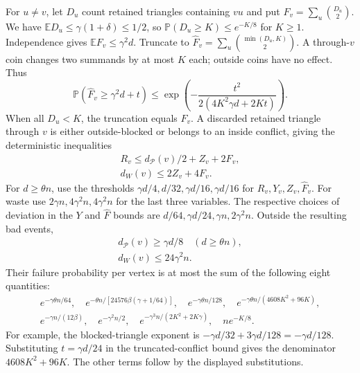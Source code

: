 \documentclass[english,11pt,a4paper]{article}
\begin{document}
For \(u\ne v\), let \(D_u\) count retained triangles containing \(vu\) and put \(F_v=\sum_u\binom{D_u}{2}\). We have \(\mathbb ED_u\le\gamma(1+\delta)\le1/2\), so \(\mathbb P(D_u\ge K)\le e^{-K/8}\) for \(K\ge1\). Independence gives \(\mathbb EF_v\le\gamma^2d\). Truncate to \(\widehat F_v=\sum_u\binom{\min(D_u,K)}2\). A through-\(v\) coin changes two summands by at most \(K\) each; outside coins have no effect. Thus \[\mathbb P(\widehat F_v\ge\gamma^2d+t)
\le\exp\left(-\frac{t^2}{2(4K^2\gamma d+2Kt)}\right).\] When all \(D_u<K\), the truncation equals \(F_v\). A discarded retained triangle through \(v\) is either outside-blocked or belongs to an inside conflict, giving the deterministic inequalities \[\begin{gathered}
R_v\le d_{\mathcal P}(v)/2+Z_v+2F_v,\\
d_W(v)\le2Z_v+4F_v.
\end{gathered}\] For \(d\ge\theta n\), use the thresholds \(\gamma d/4,d/32,\gamma d/16,\gamma d/16\) for \(R_v,Y_v,Z_v,\widehat F_v\). For waste use \(2\gamma n,4\gamma^2n,4\gamma^2n\) for the last three variables. The respective choices of deviation in the \(Y\) and \(\widehat F\) bounds are \(d/64,\gamma d/24,\gamma n,2\gamma^2n\). Outside the resulting bad events, \[\begin{gathered}
d_{\mathcal P}(v)\ge\gamma d/8\quad(d\ge\theta n),\\
d_W(v)\le24\gamma^2n.
\end{gathered}\] Their failure probability per vertex is at most the sum of the following eight quantities: \[\begin{gathered}
e^{-\gamma\theta n/64},\quad
e^{-\theta n/[24576\beta(\gamma+1/64)]},\quad
e^{-\gamma\theta n/128},\quad
e^{-\gamma\theta n/(4608K^2+96K)},\\
e^{-\gamma n/(12\beta)},\quad e^{-\gamma^2n/2},\quad
e^{-\gamma^3n/(2K^2+2K\gamma)},\quad ne^{-K/8}.
\end{gathered}\] For example, the blocked-triangle exponent is \(-\gamma d/32+3\gamma d/128=-\gamma d/128\). Substituting \(t=\gamma d/24\) in the truncated-conflict bound gives the denominator \(4608K^2+96K\). The other terms follow by the displayed substitutions.
\end{document}
